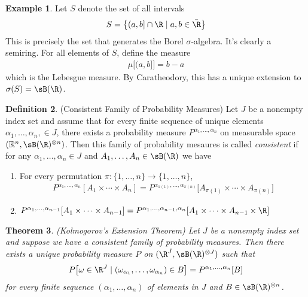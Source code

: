 \documentclass[12pt]{article}
\theoremstyle{plain}
\newtheorem{thm}{Theorem}[section]
\theoremstyle{definition}
\newtheorem{defn}[thm]{Definition}
\newtheorem{ex}[thm]{Example}
\theoremstyle{remark}
\newcommand{\ra}{\rightarrow}
\newcommand{\Rn}{\mathbb{R}^n}
\begin{document}
\begin{ex}
Let $S$ denote the set of all intervals
\begin{align*}
  S = \left\{ (a,b] \cap \R \;|\; a,b\in\bar{\R}\right\}
\end{align*}
This is precisely the set that generates the Borel $\sigma$-algebra.
It's clearly a semiring. For all elements of $S$, define the measure
\begin{align*}
  \mu\big[(a,b]\big] = b-a
\end{align*}
which is the Lebesgue measure. By Caratheodory, this has a unique
extension to $\sigma(S)=\sB(\R)$.
\end{ex}

\begin{defn}(Consistent Family of Probability Measures)
Let $J$ be a nonempty index set and assume that for every finite
sequence of unique elements $\alpha_1,\ldots,\alpha_n,\in J$, there
exists a probability measure $P^{\alpha_1,\ldots,\alpha_n}$ on
measurable space $(\Rn, \sB(\R)^{\otimes n})$. Then this family of
probability mesaures is called \emph{consistent} if for any
$\alpha_1,\ldots,\alpha_n\in J$ and $A_1,\ldots,A_n\in\sB(\R)$ we have
\begin{enumerate}[label=(\roman*)]
  \item For every permutation $\pi: \{1,\ldots,n\}\ra \{1,\ldots,n\}$,
    \begin{align*}
      P^{\alpha_1,\ldots,\alpha_n}[A_1\times \cdots \times A_n]
      =
      P^{\alpha_{\pi(1)},\ldots,\alpha_{\pi(n)}}\big[
          A_{\pi(1)}\times \cdots \times A_{\pi(n)}
      \big]
    \end{align*}
  \item
      $P^{\alpha_1,\ldots,\alpha_{n-1}}[A_1\times \cdots \times A_{n-1}]
      =
      P^{\alpha_1,\ldots,\alpha_{n-1},\alpha_n}[
        A_1\times \cdots \times A_{n-1} \times \R]
      $
\end{enumerate}
\end{defn}

\clearpage
\begin{thm}\emph{(Kolmogorov's Extension Theorem)}
Let $J$ be a nonempty index set and suppose we have a consistent family
of probability measures. Then there exists a \emph{unique} probability
measure $P$ on $(\R^J,\sB(\R)^{\otimes J})$ such that
\begin{align*}
  P\big[
    \omega\in \R^J \; |\; (\omega_{\alpha_1},\ldots,\omega_{\alpha_n})
    \in B
  \big]
  = P^{\alpha_1,\ldots,\alpha_n}[B]
\end{align*}
for every finite sequence $(\alpha_1,\ldots,\alpha_n)$ of elements in
$J$ and $B\in\sB(\R)^{\otimes n}$.
\end{thm}
\end{document}
